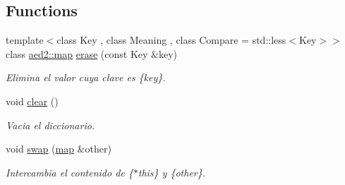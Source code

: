 \subsection*{Functions}
\begin{DoxyCompactItemize}
\item 
{\footnotesize template$<$class Key , class Meaning , class Compare  = std\+::less$<$\+Key$>$$>$ }\\class \hyperlink{classaed2_1_1map}{aed2\+::map} \hyperlink{namespaceaed2_af94e184e6463abb6f7f5237afd0d808a}{erase} (const Key \&key)
\begin{DoxyCompactList}\small\item\em Elimina el valor cuya clave es \{key\}. \end{DoxyCompactList}\item 
void \hyperlink{namespaceaed2_ac055546b287d4b50772e8b4e9d188ed2}{clear} ()
\begin{DoxyCompactList}\small\item\em Vacia el diccionario. \end{DoxyCompactList}\item 
void \hyperlink{namespaceaed2_ab24ac4be44835194ce27a61969e4a292}{swap} (\hyperlink{classaed2_1_1map}{map} \&other)
\begin{DoxyCompactList}\small\item\em Intercambia el contenido de \{$\ast$this\} y \{other\}. \end{DoxyCompactList}\end{DoxyCompactItemize}

